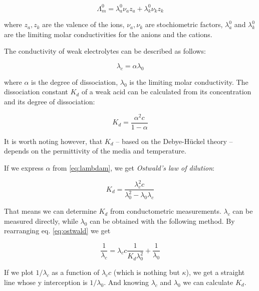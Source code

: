 \begin{equation}
\label{eq:kohlrausch2}
	\Lambda _m^0
	=
	\lambda _a^0 \nu _a z_a + \lambda _k^0 \nu _k z_k
\end{equation}

where $z_a, z_k$ are the valence of the ions, $\nu _a, \nu _k$ are stochiometric factors, $\lambda _a^0$ and $\lambda _k^0$ are the limiting molar conductivities for the anions and the cations.

The conductivity of weak electrolytes can be described as follows:

\begin{equation}
\label{eq:lambdam}
        \lambda_c
        =
        \alpha
	\lambda_0
\end{equation}

where $\alpha$ is the degree of dissociation, $\lambda _0$ is the limiting molar conductivity.
The dissociation constant $K_d$ of a weak acid can be calculated from its concentration and its degree of dissociation:

\begin{equation}
\label{eq:kd}
        K_d
        =
        \frac{\alpha^2 c}{1-\alpha}
\end{equation}

It is worth noting however, that $K_d$ -- based on the Debye-Hückel theory -- depends on the permittivity of the media and temperature.

If we express $\alpha$ from \ref{eq:lambdam}, we get \emph{Ostwald's law of dilution}:

\begin{equation}
\label{eq:ostwald}
        K_d
        =
        \frac{\lambda_c^2 c}{\lambda_0^2 - \lambda_0\lambda_c}
\end{equation}

That means we can determine $K_d$ from conductometric measurements. $\lambda_c$ can be measured directly, while $\lambda_0$ can be obtained with the following method. By rearranging eq. \ref{eq:ostwald} we get

\begin{equation}
\label{eq:ostwald2}
        \frac{1}{\lambda_c}
        =
	\lambda_c
	c
	\frac{1}{K_d \lambda_0^2}
	+\frac{1}{\lambda_0}
\end{equation}

If we plot $1/\lambda_c$ as a function of $\lambda_c c$ (which is nothing but $\kappa$), we get a straight line whose y interception is $1/\lambda_0$. And knowing $\lambda_c$ and $\lambda_0$ we can calculate $K_d$.

